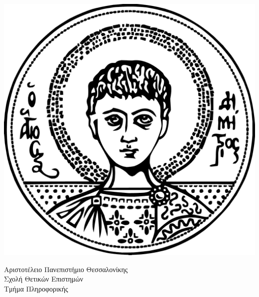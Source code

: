 \begin{minipage}{0.12\textwidth}
	    \includegraphics[width=\linewidth]{pictures/AUThLogo.png}
	\end{minipage}
	\hspace{1em}
	\begin{minipage}{0.65\textwidth}
    	Αριστοτέλειο Πανεπιστήμιο Θεσσαλονίκης\\
    	Σχολή Θετικών Επιστημών \\
    	Τμήμα Πληροφορικής
	\end{minipage}


